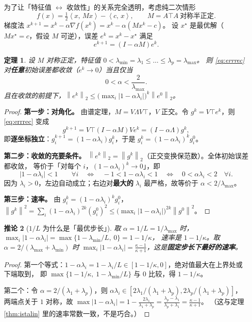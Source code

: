 \documentclass[11pt,a4paper,UTF8]{ctexart}
\theoremstyle{plain}
\newtheorem{theorem}{定理}[section]
\newtheorem{corollary}[theorem]{推论}
\theoremstyle{definition}
\theoremstyle{remark}
\newcommand{\norm}[1]{\left\lVert #1 \right\rVert}
\newcommand{\abs}[1]{\left\lvert #1 \right\rvert}
\newcommand{\inner}[2]{\left\langle #1,\, #2 \right\rangle}
\begin{document}
为了让「特征值 $\leftrightarrow$ 收敛性」的关系完全透明，考虑纯二次情形
\[
f(x)=\tfrac12\inner{x}{Mx}-\inner{c}{x},\qquad M=A\top A\ \text{对称半正定}.
\]
梯度法 $x^{k+1}=x^k-\alpha\nabla f(x^k)=x^k-\alpha(Mx^k-c)$。
设 $x^\star$ 是最优解（$Mx^\star=c$，假设 $M$ 可逆），误差 $e^k=x^k-x^\star$ 满足
\begin{equation}
e^{k+1}=(I-\alpha M)e^k .
\label{eq:errrec}
\end{equation}

\begin{theorem}\label{thm:stepsize}
设 $M$ 对称正定，特征值 $0<\lambda_{\min}=\lambda_1\le\dots\le\lambda_p=\lambda_{\max}$。
则 \eqref{eq:errrec} 对\textbf{任意}初始误差都收敛（$e^k\to0$）当且仅当
\[
0<\alpha<\frac{2}{\lambda_{\max}} .
\]
且在收敛的前提下，$\norm{e^k}_2\le\bigl(\max_i\abs{1-\alpha\lambda_i}\bigr)^k\norm{e^0}_2$。
\end{theorem}

\begin{proof}
\textbf{第一步：对角化。} 由谱定理，$M=V\Lambda V\top$，$V$ 正交。令 $g^k=V\top e^k$，则
\eqref{eq:errrec} 变成
\[
g^{k+1}=V\top(I-\alpha M)Ve^{k}= (I-\alpha\Lambda)g^k,
\]
即\textbf{逐坐标独立}：$g_i^{k+1}=(1-\alpha\lambda_i)g_i^k$，于是 $g_i^k=(1-\alpha\lambda_i)^kg_i^0$。

\textbf{第二步：收敛的充要条件。}
$\norm{e^k}_2=\norm{g^k}_2$（正交变换保范数）。全体初始误差都收敛，
等价于「对每个 $i$，$(1-\alpha\lambda_i)^k\to0$」，即
\[
\abs{1-\alpha\lambda_i}<1\qquad\forall i
\quad\Longleftrightarrow\quad
-1<1-\alpha\lambda_i<1
\quad\Longleftrightarrow\quad
0<\alpha\lambda_i<2\quad\forall i .
\]
因为 $\lambda_i>0$，左边自动成立；右边对\textbf{最大的} $\lambda_i$ 最严格，故等价于
$\alpha<2/\lambda_{\max}$。

\textbf{第三步：速率。} 由 $g_i^k=(1-\alpha\lambda_i)^kg_i^0$，
$\norm{g^k}^2=\sum_i(1-\alpha\lambda_i)^{2k}(g_i^0)^2\le\bigl(\max_i\abs{1-\alpha\lambda_i}\bigr)^{2k}\norm{g^0}^2$。
\end{proof}

\begin{corollary}[$1/L$ 为什么是「最优步长」]
取 $\alpha=1/L=1/\lambda_{\max}$ 时，$\max_i\abs{1-\alpha\lambda_i}=\max\{1-\lambda_{\min}/L,\ 0\}=1-1/\kappa$，
速率是 $1-1/\kappa$。取 $\alpha=2/(\lambda_{\max}+\lambda_{\min})$ 时
$\max_i\abs{1-\alpha\lambda_i}=\frac{\kappa-1}{\kappa+1}$，这是\textbf{固定步长下最好的速率}。
\end{corollary}

\begin{proof}
第一个等式：$1-\alpha\lambda_i=1-\lambda_i/L\in[1-1/\kappa,0]$，绝对值最大在上界处或下端取到，
即 $\max\{1-1/\kappa,\ 1-\lambda_{\min}/L\}$ 与 $0$ 比较，得 $1-1/\kappa$。

第二个：令 $\alpha=2/(\lambda_1+\lambda_p)$，则 $\alpha\lambda_i\in[2\lambda_1/(\lambda_1+\lambda_p),2\lambda_p/(\lambda_1+\lambda_p)]$，
两端点关于 $1$ 对称，故 $\max\abs{1-\alpha\lambda_i}=1-\frac{2\lambda_1}{\lambda_1+\lambda_p}=\frac{\lambda_p-\lambda_1}{\lambda_p+\lambda_1}=\frac{\kappa-1}{\kappa+1}$。
（这与定理 \ref{thm:istalin} 里的速率常数一致，不是巧合。）
\end{proof}
\end{document}

